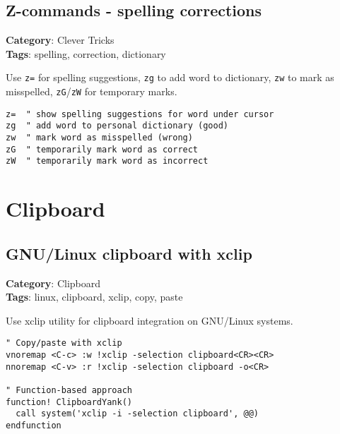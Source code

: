 {{{{\section{Z-commands - spelling corrections}

\textbf{Category}: Clever Tricks\\ \textbf{Tags}: spelling, correction, dictionary
\vspace{0.5cm}

Use {\footnotesize \Verb§z=§} for spelling suggestions, {\footnotesize \Verb§zg§} to add word to dictionary, {\footnotesize \Verb§zw§} to mark as misspelled, {\footnotesize \Verb§zG§}/{\footnotesize \Verb§zW§} for temporary marks.

\begin{Exa*}{}
\begin{Verbatim}[fontsize=\footnotesize, breaklines, breakanywhere]
z=  " show spelling suggestions for word under cursor
zg  " add word to personal dictionary (good)
zw  " mark word as misspelled (wrong)
zG  " temporarily mark word as correct
zW  " temporarily mark word as incorrect
\end{Verbatim}
\end{Exa*}

\chapter{Clipboard}
\section{GNU/Linux clipboard with xclip}

\textbf{Category}: Clipboard\\ \textbf{Tags}: linux, clipboard, xclip, copy, paste
\vspace{0.5cm}

Use xclip utility for clipboard integration on GNU/Linux systems.

\begin{Exa*}{}
\begin{Verbatim}[fontsize=\footnotesize, breaklines, breakanywhere]
" Copy/paste with xclip
vnoremap <C-c> :w !xclip -selection clipboard<CR><CR>
nnoremap <C-v> :r !xclip -selection clipboard -o<CR>

" Function-based approach
function! ClipboardYank()
  call system('xclip -i -selection clipboard', @@)
endfunction
\end{Verbatim}
\end{Exa*}

}}}}
